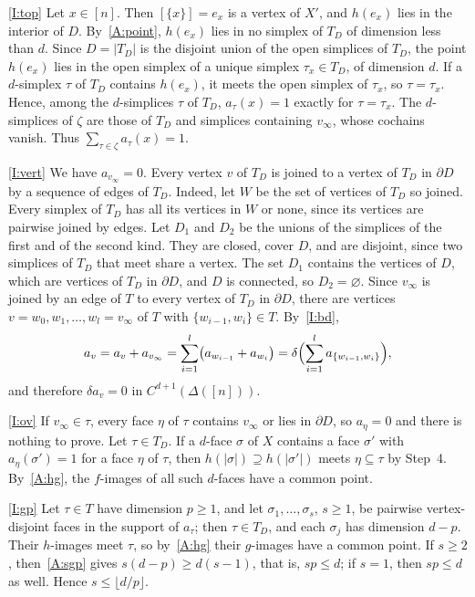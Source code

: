 \documentclass[11pt]{article}
\theoremstyle{definition}
\numberwithin{equation}{section}
\begin{document}
\ref{I:top} Let $x\in[n]$. Then $[\{x\}]=e_x$ is a vertex of $X'$, and $h(e_x)$ lies in the interior of $D$. By~\ref{A:point}, $h(e_x)$ lies in no simplex of $T_D$ of dimension less than $d$. Since $D=|T_D|$ is the disjoint union of the open simplices of $T_D$, the point $h(e_x)$ lies in the open simplex of a unique simplex $\tau_x\in T_D$, of dimension $d$. If a $d$-simplex $\tau$ of $T_D$ contains $h(e_x)$, it meets the open simplex of $\tau_x$, so $\tau=\tau_x$. Hence, among the $d$-simplices $\tau$ of $T_D$, $a_\tau(x)=1$ exactly for $\tau=\tau_x$. The $d$-simplices of $\zeta$ are those of $T_D$ and simplices containing $v_\infty$, whose cochains vanish. Thus $\sum_{\tau\in\zeta}a_\tau(x)=1$.

\ref{I:vert} We have $a_{v_\infty}=0$. Every vertex $v$ of $T_D$ is joined to a vertex of $T_D$ in $\partial D$ by a sequence of edges of $T_D$. Indeed, let $W$ be the set of vertices of $T_D$ so joined. Every simplex of $T_D$ has all its vertices in $W$ or none, since its vertices are pairwise joined by edges. Let $D_1$ and $D_2$ be the unions of the simplices of the first and of the second kind. They are closed, cover $D$, and are disjoint, since two simplices of $T_D$ that meet share a vertex. The set $D_1$ contains the vertices of $D$, which are vertices of $T_D$ in $\partial D$, and $D$ is connected, so $D_2=\varnothing$. Since $v_\infty$ is joined by an edge of $T$ to every vertex of $T_D$ in $\partial D$, there are vertices $v=w_0,w_1,\ldots,w_l=v_\infty$ of $T$ with $\{w_{i-1},w_i\}\in T$. By~\ref{I:bd},
\begin{equation*}
 a_v=a_v+a_{v_\infty}=\sum_{i=1}^l\bigl(a_{w_{i-1}}+a_{w_i}\bigr)=\delta\Bigl(\sum_{i=1}^la_{\{w_{i-1},w_i\}}\Bigr),
\end{equation*}
and therefore $\delta a_v=0$ in $C^{d+1}(\Delta([n]))$.

\ref{I:ov} If $v_\infty\in\tau$, every face $\eta$ of $\tau$ contains $v_\infty$ or lies in $\partial D$, so $a_\eta=0$ and there is nothing to prove. Let $\tau\in T_D$. If a $d$-face $\sigma$ of $X$ contains a face $\sigma'$ with $a_\eta(\sigma')=1$ for a face $\eta$ of $\tau$, then $h(|\sigma|)\supseteq h(|\sigma'|)$ meets $\eta\subseteq\tau$ by Step~4. By~\ref{A:hg}, the $f$-images of all such $d$-faces have a common point.

\ref{I:gp} Let $\tau\in T$ have dimension $p\ge1$, and let $\sigma_1,\ldots,\sigma_s$, $s\ge1$, be pairwise vertex-disjoint faces in the support of $a_\tau$; then $\tau\in T_D$, and each $\sigma_j$ has dimension $d-p$. Their $h$-images meet $\tau$, so by~\ref{A:hg} their $g$-images have a common point. If $s\ge2$, then~\ref{A:sgp} gives $s(d-p)\ge d(s-1)$, that is, $sp\le d$; if $s=1$, then $sp\le d$ as well. Hence $s\le\lfloor d/p\rfloor$.
\end{document}
